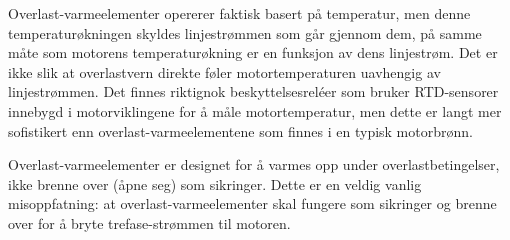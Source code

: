 \vskip 10pt

Overlast-varmeelementer opererer faktisk basert på temperatur, men denne temperaturøkningen skyldes linjestrømmen som går gjennom dem, på samme måte som motorens temperaturøkning er en funksjon av dens linjestrøm. Det er ikke slik at overlastvern direkte føler motortemperaturen uavhengig av linjestrømmen. Det finnes riktignok beskyttelsesreléer som bruker RTD-sensorer innebygd i motorviklingene for å måle motortemperatur, men dette er langt mer sofistikert enn overlast-varmeelementene som finnes i en typisk motorbrønn.

\vskip 10pt

Overlast-varmeelementer er designet for å varmes opp under overlastbetingelser, ikke brenne over (åpne seg) som sikringer. Dette er en veldig vanlig misoppfatning: at overlast-varmeelementer skal fungere som sikringer og brenne over for å bryte trefase-strømmen til motoren.


